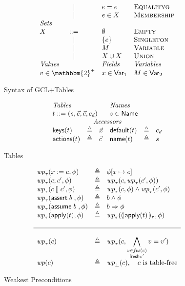 \begin{figure}[ht]
\[\begin{array}{l c l l}
        & \mid & e = e & \textsc{Equalityg} \\
        & \mid & e \in X & \textsc{Membership} \\
      \multicolumn 3 l{\textit{Sets}} \\
      X &::=& \emptyset & \textsc{Empty} \\
        & \mid & \{e\} & \textsc{Singleton}\\
        & \mid & M & \textsc{Variable} \\
        & \mid & X \cup X & \textsc{Union}\\
     \multicolumn{2}{l}{\textit{Values}} & \textit{Fields}  & \textit{Variables}\\
     \multicolumn{2}{l}{v \in \mathbbm{2}^+} & x \in \mathsf{Var}_1 & M \in \mathsf{Var}_2
    \end{array}\]

  \caption{Syntax of GCL+Tables}
  \label{fig:syntaxgcl}
  
\end{figure}


\begin{figure}[ht]
  \[\begin{array}{l >{\triangleq}c l l >{\triangleq}c l}
      \multicolumn 3 l {\textit{Tables}}  & \multicolumn 3 l {\textit{Names}}\\
      \multicolumn 3 l {t::= (s,\vec e, \vec c, c_d)} & \multicolumn 3 l {s \in \Name}\\
      \multicolumn 6 c {\textit{Accessors}}\\
      \keys t && \vec x &  \default t && c_d \\
      \actions t && \vec c & \name t && s
    \end{array}\]

  \caption{Tables}
  \label{fig:tables}
\end{figure}

\begin{figure}[ht]
  \[\begin{array}{l >{\triangleq}c l}
      \wp_\tau(x:=e, \phi) && \phi[x \mapsto e]\\
      \wp_\tau(c;c', \phi) && \wp_\tau(c, \wp_\tau(c', \phi)) \\
      \wp_\tau(c\angel c', \phi) && \wp_\tau(c, \phi) \wedge \wp_\tau(c',\phi) \\
      \wp_\tau(\assert b, \phi) && b \wedge \phi \\
      \wp_\tau(\assume b, \phi) && b \Rightarrow \phi \\
      \wp_\tau(\apply t, \phi) && \wp_\tau(\parenbb{\apply t}_\tau, \phi)\\\\\hline\\
      
      \wp_\tau(c) && \wp_\tau(c,\displaystyle \bigwedge_{\substack{v \in \fvs(c) \\ \mathsf{fresh} v'}} v = v') \\
      \wp(c) && \wp_\bot(c), \quad c \text{ is table-free}
    \end{array}\]
  \caption{Weakest Preconditions}
  \label{fig:wp}
\end{figure}

